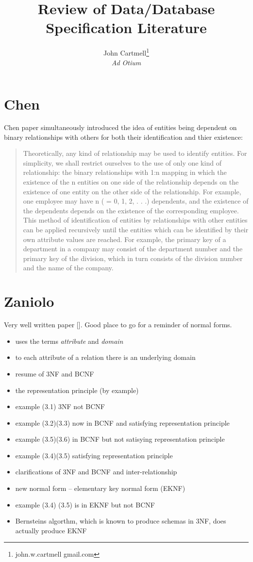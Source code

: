 \documentclass[10pt,a4paper]{scrartcl}
\title{Review of Data/Database Specification Literature}
\author{John Cartmell\footnote{john.w.cartmell gmail.com}\\ \normalsize{\textit{Ad Otium}}}
\begin{document}
\maketitle

\section{Chen}
Chen paper simultaneously introduced the idea of entities being dependent on binary relationships 
with others for both their identification and thier existence:
\begin{quote}
Theoretically, any kind of relationship may be used to identify entities. For
simplicity, we shall restrict ourselves to the use of only one kind of relationship:
the binary relationships with 1:n mapping in which the existence of the n entities
on one side of the relationship depends on the existence of one entity on the other
side of the relationship. For example, one employee may have n ( = 0, 1, 2, . . .)
dependents, and the existence of the dependents depends on the existence of the
corresponding employee.
This method of identification of entities by relationships with other entities can
be applied recursively until the entities which can be identified by their own attribute
values are reached. For example, the primary key of a department in a
company may consist of the department number and the primary key of the
division, which in turn consists of the division number and the name of the company.
\end{quote}

\section{Zaniolo}
Very well written paper [\cite{zaniolo1982}]. Good place to go for a reminder of normal forms.
\begin{itemize}
\item uses the terms \textit{attribute} and \textit{domain} 
\item to each attribute of a relation there is an underlying domain
\item resume of 3NF and BCNF
\item the representation principle (by example)
\item example (3.1) 3NF not BCNF
\item example (3.2)(3.3) now in BCNF and satisfying representation principle
\item example (3.5)(3.6) in BCNF but not satisying representation principle
\item example (3.4)(3.5) satisfying representation principle
\item clarifications of 3NF and BCNF and inter-relationship
\item new normal form -- elementary key normal form (EKNF)
\item example (3.4) (3.5) is in EKNF but not BCNF
\item Bernsteins algorthm, which is known to produce schemas in 3NF, does actually produce EKNF
\end{itemize}
\end{document}
